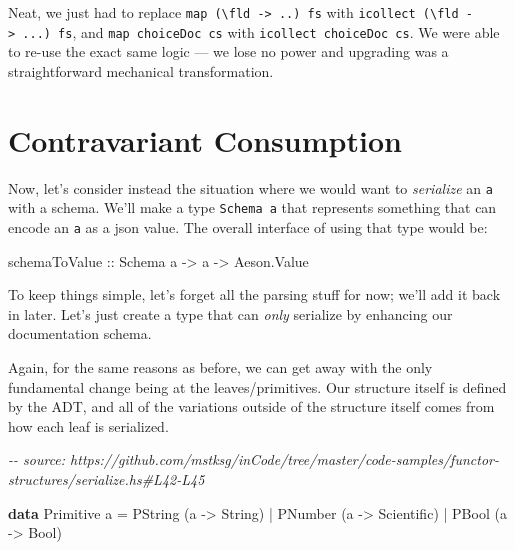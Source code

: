 \documentclass[]{article}
\newenvironment{Shaded}{}{}
\newcommand{\CommentTok}[1]{\textcolor[rgb]{0.38,0.63,0.69}{\textit{#1}}}
\newcommand{\DataTypeTok}[1]{\textcolor[rgb]{0.56,0.13,0.00}{#1}}
\newcommand{\KeywordTok}[1]{\textcolor[rgb]{0.00,0.44,0.13}{\textbf{#1}}}
\newcommand{\NormalTok}[1]{#1}
\newcommand{\OperatorTok}[1]{\textcolor[rgb]{0.40,0.40,0.40}{#1}}
\newcommand{\OtherTok}[1]{\textcolor[rgb]{0.00,0.44,0.13}{#1}}
\begin{document}
Neat, we just had to replace
\texttt{map\ (\textbackslash{}fld\ -\textgreater{}\ ..)\ fs} with
\texttt{icollect\ (\textbackslash{}fld\ -\textgreater{}\ ...)\ fs}, and
\texttt{map\ choiceDoc\ cs} with \texttt{icollect\ choiceDoc\ cs}. We were able
to re-use the exact same logic --- we lose no power and upgrading was a
straightforward mechanical transformation.

\hypertarget{contravariant-consumption}{%
\section{Contravariant Consumption}\label{contravariant-consumption}}

Now, let's consider instead the situation where we would want to
\emph{serialize} an \texttt{a} with a schema. We'll make a type
\texttt{Schema\ a} that represents something that can encode an \texttt{a} as a
json value. The overall interface of using that type would be:

\begin{Shaded}
\begin{Highlighting}[]
\OtherTok{schemaToValue ::} \DataTypeTok{Schema}\NormalTok{ a }\OtherTok{{-}>}\NormalTok{ a }\OtherTok{{-}>} \DataTypeTok{Aeson.Value}
\end{Highlighting}
\end{Shaded}

To keep things simple, let's forget all the parsing stuff for now; we'll add it
back in later. Let's just create a type that can \emph{only} serialize by
enhancing our documentation schema.

Again, for the same reasons as before, we can get away with the only fundamental
change being at the leaves/primitives. Our structure itself is defined by the
ADT, and all of the variations outside of the structure itself comes from how
each leaf is serialized.

\begin{Shaded}
\begin{Highlighting}[]
\CommentTok{{-}{-} source: https://github.com/mstksg/inCode/tree/master/code{-}samples/functor{-}structures/serialize.hs\#L42{-}L45}

\KeywordTok{data} \DataTypeTok{Primitive}\NormalTok{ a }\OtherTok{=}
      \DataTypeTok{PString}\NormalTok{ (a }\OtherTok{{-}>} \DataTypeTok{String}\NormalTok{)}
    \OperatorTok{|} \DataTypeTok{PNumber}\NormalTok{ (a }\OtherTok{{-}>} \DataTypeTok{Scientific}\NormalTok{)}
    \OperatorTok{|} \DataTypeTok{PBool}\NormalTok{   (a }\OtherTok{{-}>} \DataTypeTok{Bool}\NormalTok{)}
\end{Highlighting}
\end{Shaded}
\end{document}
